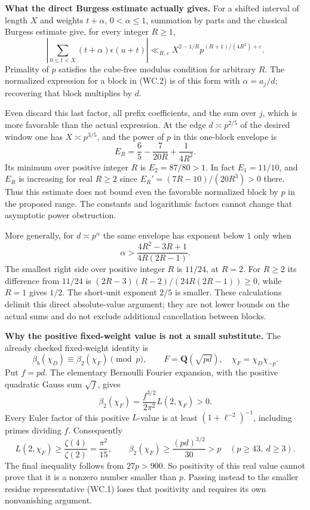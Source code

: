 \documentclass[11pt,a4paper]{article}
\theoremstyle{definition}
\renewcommand{\paragraph}[1]{\par\smallskip\noindent\textbf{#1}\quad\ignorespaces}
\begin{document}
\paragraph{What the direct Burgess estimate actually gives.}
For a shifted interval of length $X$ and weights
$t+\alpha$, $0<\alpha\leq1$, summation by parts and
the classical Burgess estimate give, for every integer
$R\geq1$,
\[
 \left|\sum_{0\leq t<X}(t+\alpha)\epsilon(u+t)\right|
 \ll_{R,\varepsilon}
       X^{2-1/R}p^{(R+1)/(4R^2)+\varepsilon}.
 \tag{WC.3}
\]
Primality of $p$ satisfies the cube-free modulus condition
for arbitrary $R$.  The normalized expression for a block
in (WC.2) is of this form with $\alpha=a_j/d$; recovering
that block multiplies by $d$.

Even discard this last factor, all prefix coefficients,
and the sum over $j$, which is more favorable than the
actual expression.  At the edge $d\asymp p^{2/5}$ of
the desired window one has $X\asymp p^{3/5}$, and the
power of $p$ in this one-block envelope is
\[
 E_R=\frac65-\frac7{20R}+\frac1{4R^2}.
 \tag{WC.4}
\]
Its minimum over positive integer $R$ is
$E_2=87/80>1$.  In fact $E_1=11/10$, and $E_R$
is increasing for real $R\geq2$ since
$E_R'=(7R-10)/(20R^3)>0$ there.
Thus this estimate does not bound even the favorable
normalized block by $p$ in the proposed range.
The constants and logarithmic factors cannot change
that asymptotic power obstruction.

More generally, for $d\asymp p^\alpha$ the same envelope
has exponent below $1$ only when
\[
 \alpha>
 \frac{4R^2-3R+1}{4R(2R-1)}.
 \tag{WC.5}
\]
The smallest right side over positive integer $R$ is
$11/24$, at $R=2$.  For $R\geq2$ its difference from
$11/24$ is
$(2R-3)(R-2)/(24R(2R-1))\geq0$, while $R=1$
gives $1/2$.  The short-unit exponent $2/5$ is smaller.
These calculations delimit this direct absolute-value
argument; they are not lower bounds on the actual sums
and do not exclude additional cancellation between blocks.

\paragraph{Why the positive fixed-weight value is not a small substitute.}
The already checked fixed-weight identity is
\[
 \beta_b(\chi_D)\equiv\beta_2(\chi_F)\pmod p,
 \qquad F=\mathbf Q(\sqrt{pd}),\quad
 \chi_F=\chi_D\chi_{-p}.
 \tag{WC.6}
\]
Put $f=pd$.  The elementary Bernoulli Fourier expansion,
with the positive quadratic Gauss sum $\sqrt f$, gives
\[
 \beta_2(\chi_F)=\frac{f^{3/2}}{2\pi^2}L(2,\chi_F)>0.
 \tag{WC.7}
\]
Every Euler factor of this positive $L$-value is at least
$(1+\ell^{-2})^{-1}$, including primes dividing $f$.
Consequently
\[
 L(2,\chi_F)\geq\frac{\zeta(4)}{\zeta(2)}
                  =\frac{\pi^2}{15},\qquad
 \beta_2(\chi_F)\geq\frac{(pd)^{3/2}}{30}>p
       \quad(p\geq43,\ d\geq3).
 \tag{WC.8}
\]
The final inequality follows from $27p>900$.
So positivity of this real value cannot prove that it
is a nonzero number smaller than $p$.  Passing instead
to the smaller residue representative (WC.1) loses
that positivity and requires its own nonvanishing argument.
\end{document}

